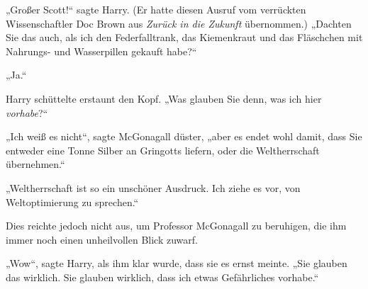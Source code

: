 „Großer Scott!“ sagte Harry. (Er hatte diesen Ausruf vom verrückten Wissenschaftler Doc Brown aus \emph{Zurück in die Zukunft} übernommen.)
„Dachten Sie das auch, als ich den Federfalltrank, das Kiemenkraut und das Fläschchen mit Nahrungs- und Wasserpillen gekauft habe?“%

„Ja.“

Harry schüttelte erstaunt den Kopf.
„Was glauben Sie denn, was ich hier \emph{vorhabe}?“

„Ich weiß es nicht“, sagte McGonagall düster, „aber es endet wohl damit, dass Sie entweder eine Tonne Silber an Gringotts liefern, oder die Weltherrschaft übernehmen.“

„Weltherrschaft ist so ein unschöner Ausdruck. Ich ziehe es vor, von Weltoptimierung zu sprechen.“

Dies reichte jedoch nicht aus, um Professor McGonagall zu beruhigen, die ihm immer noch einen unheilvollen Blick zuwarf.

„Wow“, sagte Harry, als ihm klar wurde, dass sie es ernst meinte.
„Sie glauben das wirklich. Sie glauben wirklich, dass ich etwas Gefährliches vorhabe.“

